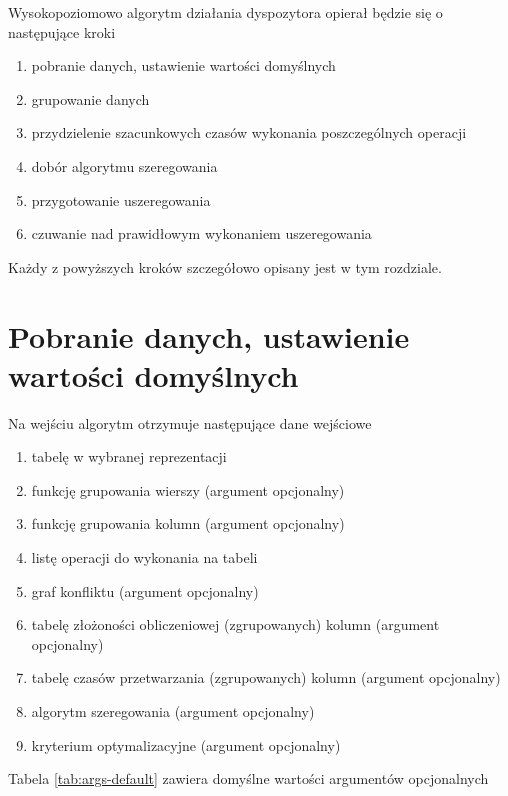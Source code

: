 \documentclass[brudnopis]{xmgr}
\begin{document}
Wysokopoziomowo algorytm działania dyspozytora opierał będzie się o następujące kroki

\begin{enumerate}
    \item pobranie danych, ustawienie wartości domyślnych
    \item grupowanie danych
    \item przydzielenie szacunkowych czasów wykonania poszczególnych operacji
    \item dobór algorytmu szeregowania 
    \item przygotowanie uszeregowania
    \item czuwanie nad prawidłowym wykonaniem uszeregowania
\end{enumerate}

Każdy z powyższych kroków szczegółowo opisany jest w tym rozdziale.
\newpage

\section{Pobranie danych, ustawienie wartości domyślnych}

Na wejściu algorytm otrzymuje następujące dane wejściowe

\begin{enumerate}
    \item tabelę w wybranej reprezentacji
    \item funkcję grupowania wierszy (argument opcjonalny)
    \item funkcję grupowania kolumn (argument opcjonalny)
    \item listę operacji do wykonania na tabeli
    \item graf konfliktu (argument opcjonalny)
    \item tabelę złożoności obliczeniowej (zgrupowanych) kolumn (argument opcjonalny)
    \item tabelę czasów przetwarzania (zgrupowanych) kolumn (argument opcjonalny)
    \item algorytm szeregowania (argument opcjonalny)
    \item kryterium optymalizacyjne (argument opcjonalny)
\end{enumerate}


Tabela \ref{tab:args-default} zawiera domyślne wartości argumentów opcjonalnych
\medskip\\
\end{document}
